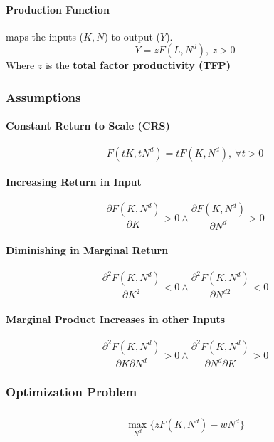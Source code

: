 \documentclass[11pt]{article}
\newcommand{\pd}[2]{\frac{\partial{#1}}{\partial{#2}}}
\begin{document}
\paragraph{Production Function} maps the inputs ($K, N$) to output ($Y$).
\[
	Y = z F(L, N^d),\ z > 0
\]
Where $z$ is the \textbf{total factor productivity (TFP)}

\subsubsection{Assumptions}
\paragraph{Constant Return to Scale (CRS)}
\begin{equation}
	F(t K, t N^d) = t F(K, N^d),\ \forall t > 0
\end{equation}
\paragraph{Increasing Return in Input}
\begin{equation}
	\pd{F(K, N^d)}{K} > 0 \land \pd{F(K, N^d)}{N^d} > 0
\end{equation}
\paragraph{Diminishing in Marginal Return}
\begin{equation}
	\frac{\partial^2F(K,N^d)}{\partial K^2} < 0 \land \frac{\partial^2F(K,N^d)}{\partial N^{d2}} < 0
\end{equation}

\paragraph{Marginal Product Increases in other Inputs}
\begin{equation}
	\frac{\partial^2F(K,N^d)}{\partial K \partial N^d} > 0 \land \frac{\partial^2F(K,N^d)}{\partial N^d \partial K} > 0
\end{equation}

\subsubsection{Optimization Problem}
\begin{multline}
	\\
	\max_{N^d} \{ z F(K, N^d) - w N^d \}
	\\
\end{multline}
\end{document}
